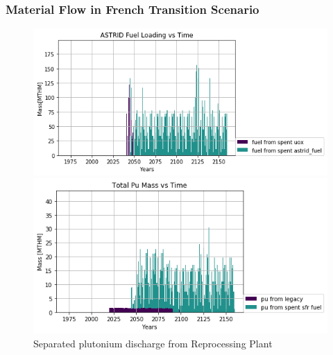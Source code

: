 \begin{frame}
	\frametitle{Material Flow in French Transition Scenario}
	
\begin{figure}[htbp!]
\begin{minipage}[b]{.45\linewidth}
	\begin{center}
		\includegraphics[width=\textwidth]{./images/french-transition/where_fuel.png}
	\end{center}
	\caption{Timeseries of fuel loaded into \glspl{SFR}, separated by origin}
	\label{fig:fuel}
\end{minipage}
\hspace{.5cm}
\begin{minipage}[b]{.45\linewidth}
	\centering
		\includegraphics[width=\linewidth]{./images/french-transition/pu.png}
	\caption{Separated plutonium discharge from Reprocessing Plant}
	\label{fig:pu_no_cum}
\end{minipage}
\end{figure}

\end{frame}

